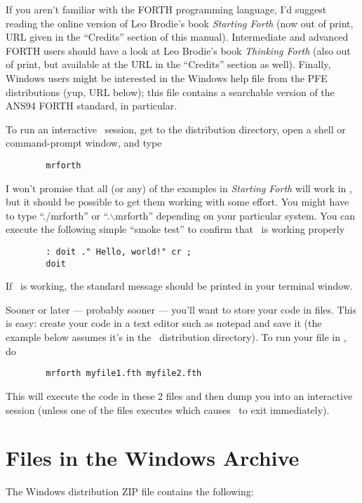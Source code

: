 \documentclass{article}
\begin{document}
If you aren't familiar with the FORTH programming language, I'd
suggest reading the online version of Leo Brodie's book
\textit{Starting Forth} (now out of print, URL given in the
``Credits'' section of this manual). Intermediate and advanced FORTH
users should have a look at Leo Brodie's book \textit{Thinking Forth}
(also out of print, but available at the URL in the ``Credits''
section as well). Finally, Windows users might be interested in the
Windows help file  from the PFE distributions (yup, URL
below); this file contains a searchable version of the ANS94 FORTH
standard, in particular.

To run an interactive \M\ session, get to the distribution directory,
open a shell or command-prompt window, and type
\begin{verbatim}
        mrforth
\end{verbatim}
I won't promise that all (or any) of the examples in
\textit{Starting Forth} will work in \M, but it should be possible
to get them working with some effort. You might have to type
``./mrforth'' or ``.$\backslash$mrforth'' depending on your particular system.
You can execute the following simple ``smoke test'' to confirm that
\M\ is working properly
\begin{verbatim}
        : doit ." Hello, world!" cr ;
        doit
\end{verbatim}
If \M\ is working, the standard message should be printed in your
terminal window.

Sooner or later --- probably sooner --- you'll want to store your
code in files. This is easy: create your code in a text editor such
as notepad and save it (the example below assumes it's in the \M\
distribution directory). To run your file in \M, do
\begin{verbatim}
        mrforth myfile1.fth myfile2.fth
\end{verbatim}
This will execute the code in these 2 files and then dump you into
an interactive session (unless one of the files executes \T{bye}
which causes \M\  to exit immediately).

\section*{Files in the Windows \T{mrforth.zip} Archive}

The Windows distribution ZIP file contains the following:
\end{document}
